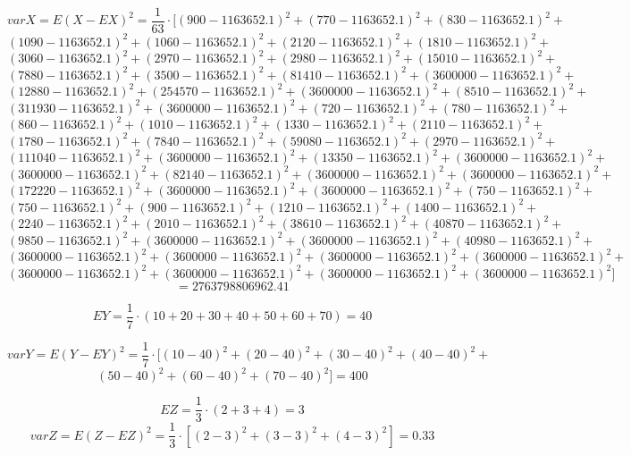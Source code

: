 \documentclass[11pt,twoside,a4paper]{book}
\begin{document}


$$varX=E(X-EX)^2=\frac{1}{63}\cdot[\left(900-1163652.1
\right)^2+\left(770-1163652.1\right)^2+\left(830 -1163652.1\right)^2+$$
$$\left(1090-1163652.1\right)^2+\left(1060-1163652.1\right)^2+\left(2120-1163652.1\right)^2+\left(1810-1163652.1\right)^2+$$
$$\left(3060-1163652.1\right)^2+\left(2970-1163652.1\right)^2+\left(2980-1163652.1\right)^2+\left(15010-1163652.1\right)^2+$$
$$\left( 7880
-1163652.1\right)^2+\left(3500-1163652.1\right)^2+\left(81410-1163652.1\right)^2+\left(3600000-1163652.1\right)^2+$$
$$\left(12880-1163652.1\right)^2+\left(254570-1163652.1\right)^2+\left(3600000-1163652.1\right)^2+\left(8510-1163652.1\right)^2+$$
$$\left(311930-1163652.1\right)^2+\left(3600000-1163652.1\right)^2+\left(720-1163652.1
\right)^2+\left(780-1163652.1\right)^2+$$
$$\left(860
-1163652.1\right)^2+\left(1010-1163652.1\right)^2+\left(1330-1163652.1\right)^2+\left(2110-1163652.1\right)^2+$$
$$\left(1780-1163652.1\right)^2+\left(7840-1163652.1\right)^2+\left(59080-1163652.1\right)^2+\left(2970-1163652.1\right)^2+$$
$$\left(111040-1163652.1\right)^2+\left( 3600000
-1163652.1\right)^2+\left(13350-1163652.1\right)^2+\left(3600000-1163652.1\right)^2+$$
$$\left(3600000-1163652.1\right)^2+\left(82140-1163652.1\right)^2+\left(3600000-1163652.1\right)^2+\left(3600000-1163652.1\right)^2+$$
$$\left(172220-1163652.1\right)^2+\left(3600000-1163652.1\right)^2+\left(3600000-1163652.1\right)^2+\left(750-1163652.1
\right)^2+$$ $$\left(750-1163652.1\right)^2+\left(900
-1163652.1\right)^2+\left(1210-1163652.1\right)^2+\left(1400-1163652.1\right)^2+$$
$$\left(2240-1163652.1\right)^2+\left(2010-1163652.1\right)^2+\left(38610-1163652.1\right)^2+\left(40870-1163652.1\right)^2+$$
$$\left(9850-1163652.1\right)^2+\left(3600000-1163652.1\right)^2+\left( 3600000
-1163652.1\right)^2+\left(40980-1163652.1\right)^2+$$
$$\left(3600000-1163652.1\right)^2+\left(3600000-1163652.1\right)^2+\left(3600000-1163652.1\right)^2+\left(3600000-1163652.1\right)^2+$$
$$\left(3600000-1163652.1\right)^2+\left(3600000-1163652.1\right)^2+\left(3600000-1163652.1\right)^2+\left(3600000-1163652.1\right)^2]$$
$$=2763798806962.41$$


$$EY = \frac{1}{7}\cdot \left(10 + 20+ 30 + 40 +  50 +  60 +
 70\right)=40$$

$$varY=E(Y-EY)^2=\frac{1}{7}\cdot[\left(10 -40\right)^2+\left(20
-40\right)^2+\left(30 -40\right)^2+\left(40 -40\right)^2+$$
$$\left(50 -40\right)^2+\left(60 -40\right)^2+\left(70 -40\right)^2]=400$$

$$EZ = \frac{1}{3}\cdot \left(2 +  3 + 4\right)=3$$
$$varZ=E(Z-EZ)^2=\frac{1}{3}\cdot [\left(2 -  3\right)^2+\left(3 - 
3\right)^2+\left(4 -  3\right)^2]=0.33$$
\end{document}
